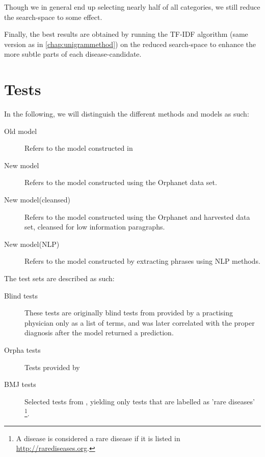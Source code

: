 \documentclass[10pt,letterpaper,final]{article}
\begin{document}
Though we in general end up selecting nearly half of all categories, we still reduce the search-space to some effect. 

Finally, the best results are obtained by running the TF-IDF algorithm (same version as in \ref{chap:unigrammethod}) on the reduced search-space to enhance the more
subtle parts of each disease-candidate.

\section{Tests}
\label{chap:test}
In the following, we will distinguish the different methods and models
as such:
\begin{description}
\item[Old model] Refers to the model constructed in
\cite{jensenandersen}
\item[New model] Refers to the model constructed using the Orphanet data
set.
\item[New model(cleansed)] Refers to the model constructed using the
Orphanet and harvested data set, cleansed for low information
paragraphs.
\item[New model(NLP)] Refers to the model constructed by extracting
phrases using NLP methods.
\end{description}

\noindent The test sets are described as such:

\begin{description}
\item[Blind tests] These tests are originally blind tests from
\cite{jensenandersen} provided by a practising physician only as a list
of terms, and was later correlated with the proper diagnosis after the
model returned a prediction.
\item[Orpha tests] Tests provided by 
\item[BMJ tests] Selected tests from \cite{googlingdiagnosis}, yielding
only tests that are labelled as 'rare diseases' \footnote{A disease is
considered a rare disease if it is listed in
\url{http://rarediseases.org}.}.
\end{description}


\end{document}
